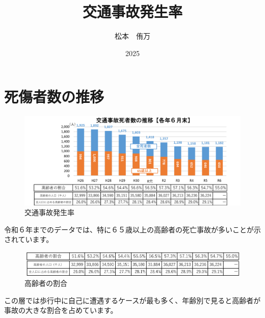 \documentclass[a4paper]{article}
\begin{document}
    \title{交通事故発生率}
    \author{松本　侑万}
    \date{2025}
    \maketitle

    \section{死傷者数の推移}

    \begin{figure}[h]
        \centering
        \includegraphics[scale = 0.7]{jiko.png}
        \caption{交通事故発生率}
        \label{fig:交通事故発生率}
    \end{figure}

    令和６年までのデータでは、特に６５歳以上の高齢者の死亡事故が多いことが示されています。\\
      
    \begin{figure}[h]
        \centering
        \includegraphics[scale = 0.7]{jiko2.png}
        \caption{高齢者の割合}
        \label{fig:交通事故発生率}
    \end{figure}

    この層では歩行中に自己に遭遇するケースが最も多く、年齢別で見ると高齢者が事故の大きな割合を占めています。\\
\end{document}
